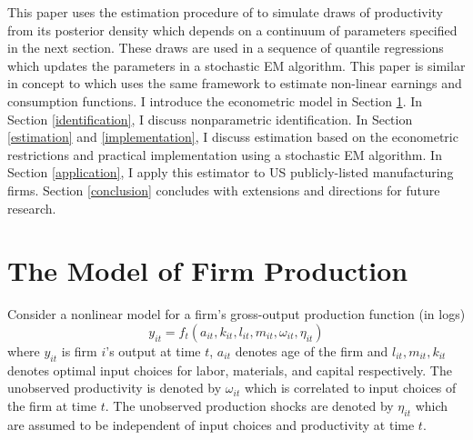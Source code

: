\documentclass{article}
\begin{document}
This paper uses the estimation procedure of \cite{Arellano2016} to simulate draws of productivity from its posterior density which depends on a continuum of parameters specified in the next section. These draws are used in a sequence of quantile regressions which updates the parameters in a stochastic EM algorithm. This paper is similar in concept to \cite{Arellano2017} which uses the same framework to estimate non-linear earnings and consumption functions. I introduce the econometric model in Section \ref{model}. In Section \ref{identification}, I discuss nonparametric identification. In Section \ref{estimation} and \ref{implementation}, I discuss estimation based on the econometric restrictions and practical implementation using a stochastic EM algorithm. In Section \ref{application}, I apply this estimator to US publicly-listed manufacturing firms. Section \ref{conclusion} concludes with extensions and directions for future research.



\section{The Model of Firm Production} \label{model}

Consider a nonlinear model for a firm's gross-output production function (in logs)
\begin{equation}\label{modelY}
y_{it}=f_{t}(a_{it}, k_{it}, l_{it}, m_{it}, \omega_{it}, \eta_{it})
\end{equation}
where $y_{it}$ is firm $i$'s output at time $t$, $a_{it}$ denotes age of the firm and $l_{it}, m_{it}, k_{it}$ denotes optimal input choices for labor, materials, and capital respectively. The unobserved productivity is denoted by $\omega_{it}$ which is correlated to input choices of the firm at time $t$. The unobserved production shocks are denoted by $\eta_{it}$ which are assumed to be independent of input choices and productivity at time $t$.\\
\end{document}
